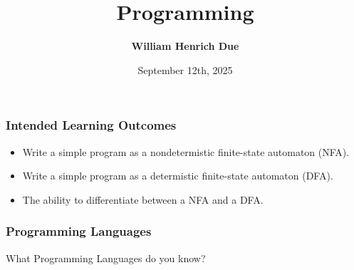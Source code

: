 \documentclass[aspectratio=169]{beamer}
\title[Programming]{Programming}
\author{\textbf{William Henrich Due} \inst{1}}
\institute[shortinst]{\inst{1} Department of Computer Science}
\date{September 12th, 2025}
\begin{document}
\begin{frame}
  \begin{center}
    \titlepage
    \vfill
  \end{center}
\end{frame}

\begin{frame}\frametitle{Intended Learning Outcomes}
  \begin{itemize}
    \item Write a simple program as a nondetermistic finite-state automaton (NFA).
    \item Write a simple program as a determistic finite-state automaton (DFA).
    \item The ability to differentiate between a NFA and a DFA.
  \end{itemize}
\end{frame}

\begin{frame}\frametitle{Programming Languages}
  \begin{center}
    What Programming Languages do you know?
  \end{center}
\end{frame}
\end{document}
